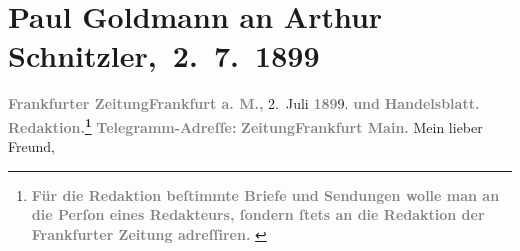 

         
         \renewcommand{\erwaehntePersonen}{Personen: Alfred Dreyfus, Paul Goldmann}
         \renewcommand{\erwaehnteInstitutionen}{Institutionen: Frankfurter Zeitung}
         \renewcommand{\erwaehnteOrte}{Orte: Belišće, Budapest, Engadin, Frankfurt am Main, Orahovica, Paris, Rennes, Schweiz, Slawonien, Wien, Österreich}
         \renewcommand{\erwaehnteWerke}{}
               \section[ Paul Goldmann an Arthur Schnitzler, 2. 7. 1899]{ Paul Goldmann an Arthur Schnitzler, 2. 7. 1899}\nopagebreak{}\rehead{ }\begin{ledgroupsized}[t]{13cm}\normalsize\beginnumbering{} \toendnotes[C]{\smallbreak\pagebreak[2]} 
\toendnotes[C]{\smallbreak}\pstart
           \noindent{}{\pb}\textcolor{gray}{\textbf{\textbf{Frankfurter Zeitung}}}\hfill \textcolor{gray}{\textbf{\textbf{Frankfurt a. M.,}}}{ }2. Juli \textcolor{gray}{\textbf{189}}9.\pend
           \pstart
           \textcolor{gray}{\textbf{und}}\pend
           \pstart
           \textcolor{gray}{\textbf{Handelsblatt.}}\pend
           \pstart
           \textcolor{gray}{\textbf{\textbf{Redaktion.}\footnote{\noindent{}\textcolor{gray}{\textbf{Für die Redaktion beſtimmte Briefe und Sendungen wolle man
                                  an die Perſon eines Redakteurs,
                              ſondern ſtets \textbf{an die Redaktion der Frankfurter Zeitung} adreſſiren. }}}}}\pend
           \pstart
           \textcolor{gray}{\textbf{Telegramm-Adreſſe:}}\pend
           \pstart
           \textcolor{gray}{\textbf{\textbf{ZeitungFrankfurt Main.}}}\pend
           \pstart\center{}Mein lieber Freund,\pend\pstart

\end{ledgroupsized}
